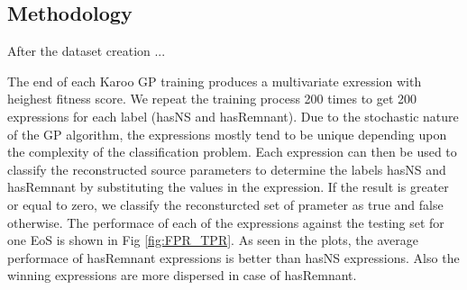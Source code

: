 \subsection{Methodology}

After the dataset creation ...

The end of each Karoo GP training produces a multivariate exression with heighest fitness score. We repeat the training process 200 times to get 200 expressions for each label (hasNS and hasRemnant). Due to the stochastic nature of the GP algorithm, the expressions mostly tend to be unique depending upon the complexity of the classification problem. Each expression can then be used to classify the reconstructed source parameters to determine the labels hasNS and hasRemnant by substituting the values in the expression. If the result is greater or equal to zero, we classify the reconsturcted set of prameter as true and false otherwise. The performace of each of the expressions against the testing set for one EoS is shown in Fig \ref{fig:FPR_TPR}. As seen in the plots, the average performace of hasRemnant expressions is better than hasNS expressions. Also the winning expressions are more dispersed in case of hasRemnant.  


